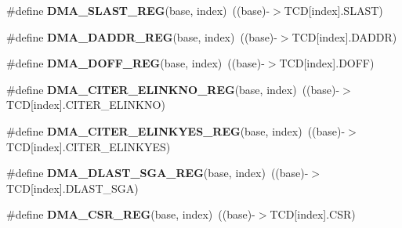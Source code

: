 \begin{DoxyCompactItemize}
\item 
\#define {\bfseries D\+M\+A\+\_\+\+S\+L\+A\+S\+T\+\_\+\+R\+EG}(base,  index)~((base)-\/$>$T\+CD\mbox{[}index\mbox{]}.S\+L\+A\+ST)\hypertarget{group__DMA__Register__Accessor__Macros_ga012ee210e5fe3243cf0d5090d59f9b1a}{}\label{group__DMA__Register__Accessor__Macros_ga012ee210e5fe3243cf0d5090d59f9b1a}

\item 
\#define {\bfseries D\+M\+A\+\_\+\+D\+A\+D\+D\+R\+\_\+\+R\+EG}(base,  index)~((base)-\/$>$T\+CD\mbox{[}index\mbox{]}.D\+A\+D\+DR)\hypertarget{group__DMA__Register__Accessor__Macros_gae2a12a88db406b5faadfcb8ae108ad53}{}\label{group__DMA__Register__Accessor__Macros_gae2a12a88db406b5faadfcb8ae108ad53}

\item 
\#define {\bfseries D\+M\+A\+\_\+\+D\+O\+F\+F\+\_\+\+R\+EG}(base,  index)~((base)-\/$>$T\+CD\mbox{[}index\mbox{]}.D\+O\+FF)\hypertarget{group__DMA__Register__Accessor__Macros_ga6d2ec5d178da38a609670b33ca2b4ad8}{}\label{group__DMA__Register__Accessor__Macros_ga6d2ec5d178da38a609670b33ca2b4ad8}

\item 
\#define {\bfseries D\+M\+A\+\_\+\+C\+I\+T\+E\+R\+\_\+\+E\+L\+I\+N\+K\+N\+O\+\_\+\+R\+EG}(base,  index)~((base)-\/$>$T\+CD\mbox{[}index\mbox{]}.C\+I\+T\+E\+R\+\_\+\+E\+L\+I\+N\+K\+NO)\hypertarget{group__DMA__Register__Accessor__Macros_ga6f2b334ee966aaed7d97a12b2f21e990}{}\label{group__DMA__Register__Accessor__Macros_ga6f2b334ee966aaed7d97a12b2f21e990}

\item 
\#define {\bfseries D\+M\+A\+\_\+\+C\+I\+T\+E\+R\+\_\+\+E\+L\+I\+N\+K\+Y\+E\+S\+\_\+\+R\+EG}(base,  index)~((base)-\/$>$T\+CD\mbox{[}index\mbox{]}.C\+I\+T\+E\+R\+\_\+\+E\+L\+I\+N\+K\+Y\+ES)\hypertarget{group__DMA__Register__Accessor__Macros_gaf014ca6b4a7bf454a74811b30aae01e6}{}\label{group__DMA__Register__Accessor__Macros_gaf014ca6b4a7bf454a74811b30aae01e6}

\item 
\#define {\bfseries D\+M\+A\+\_\+\+D\+L\+A\+S\+T\+\_\+\+S\+G\+A\+\_\+\+R\+EG}(base,  index)~((base)-\/$>$T\+CD\mbox{[}index\mbox{]}.D\+L\+A\+S\+T\+\_\+\+S\+GA)\hypertarget{group__DMA__Register__Accessor__Macros_gaaefaeb95e9b7a2fb1199c2f181ac634d}{}\label{group__DMA__Register__Accessor__Macros_gaaefaeb95e9b7a2fb1199c2f181ac634d}

\item 
\#define {\bfseries D\+M\+A\+\_\+\+C\+S\+R\+\_\+\+R\+EG}(base,  index)~((base)-\/$>$T\+CD\mbox{[}index\mbox{]}.C\+SR)\hypertarget{group__DMA__Register__Accessor__Macros_ga194fd4b02627791836763868c2b84261}{}\label{group__DMA__Register__Accessor__Macros_ga194fd4b02627791836763868c2b84261}


\end{DoxyCompactItemize}

